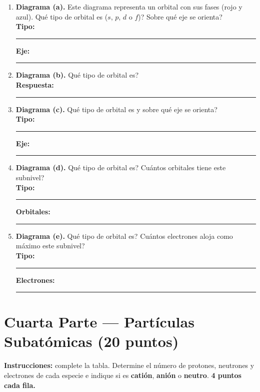 \documentclass[12pt, letterpaper]{article}
\begin{document}
\vspace{8pt}
\begin{enumerate}[leftmargin=*]
  \item \textbf{Diagrama (a).} Este diagrama representa un orbital con sus fases (rojo y azul). \textquestiondown Qué tipo de orbital es ($s$, $p$, $d$ o $f$)? \textquestiondown Sobre qué eje se orienta? \\[2pt]
        \textbf{Tipo:} \rule{3.2cm}{0.4pt} \qquad \textbf{Eje:} \rule{3.2cm}{0.4pt}

  \item \textbf{Diagrama (b).} \textquestiondown Qué tipo de orbital es? \\[2pt]
        \textbf{Respuesta:} \rule{6.5cm}{0.4pt}

  \item \textbf{Diagrama (c).} \textquestiondown Qué tipo de orbital es y sobre qué eje se orienta? \\[2pt]
        \textbf{Tipo:} \rule{3.2cm}{0.4pt} \qquad \textbf{Eje:} \rule{3.2cm}{0.4pt}

  \item \textbf{Diagrama (d).} \textquestiondown Qué tipo de orbital es? \textquestiondown Cuántos orbitales tiene este subnivel? \\[2pt]
        \textbf{Tipo:} \rule{3.2cm}{0.4pt} \qquad \textbf{Orbitales:} \rule{3.2cm}{0.4pt}

  \item \textbf{Diagrama (e).} \textquestiondown Qué tipo de orbital es? \textquestiondown Cuántos electrones aloja como máximo este subnivel? \\[2pt]
        \textbf{Tipo:} \rule{3.2cm}{0.4pt} \qquad \textbf{Electrones:} \rule{3.2cm}{0.4pt}
\end{enumerate}

\newpage

\section*{Cuarta Parte — Partículas Subatómicas (20 puntos)}

\noindent\textbf{Instrucciones:} complete la tabla. Determine el número de protones, neutrones y electrones de cada especie e indique si es \textbf{catión}, \textbf{anión} o \textbf{neutro}. \textbf{4 puntos cada fila.}
\end{document}
